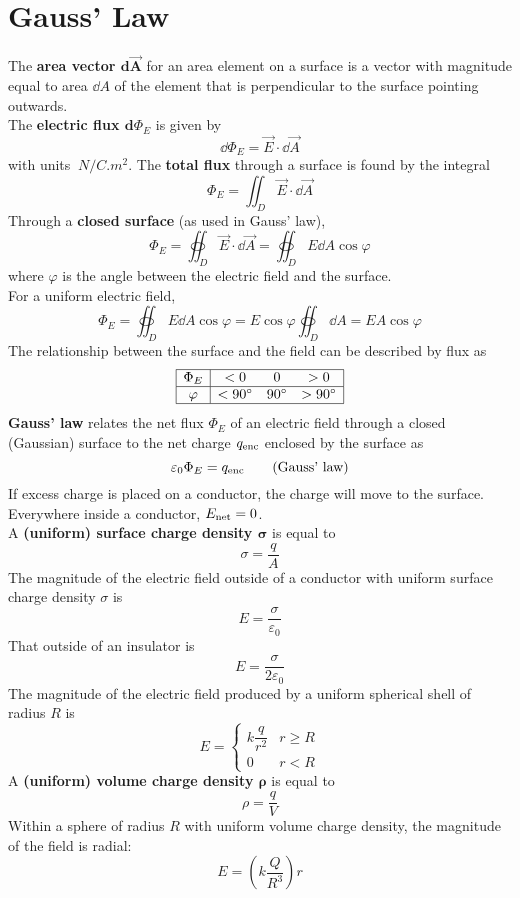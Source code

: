 \documentclass[./Electricity and Magnetism.tex]{subfiles}
\begin{document}
	\section{Gauss' Law}
		The \textbf{area vector \(\bm{\text{d}{\vec{A}}}\)} for an area element on a surface is a vector with magnitude equal to area \(\dd{A}\) of the element that is perpendicular to the surface pointing outwards. \\
		The \textbf{electric flux \({\bm{\text{d}}{\Phi_E}}\)} is given by
			\[\dd{\Phi_E} = \vec{E} \cdot \dd{\vec{A}} \tag{electric flux}\]
			with units \(\SI{}{N/C.m^2}\).
			The \textbf{total flux} through a surface is found by the integral
				\[\Phi_E = \iint_D \vec{E} \cdot \dd{\vec{A}} \tag{total flux}\]
			Through a \textbf{closed surface} (as used in Gauss' law),
				\[\Phi_E = \oiint_D \vec{E} \cdot \dd{\vec{A}} = \oiint_D E\dd{A}\cos\varphi \tag{net flux}\]
				where \(\varphi\) is the angle between the electric field and the surface. \\
				For a uniform electric field,
				\[\Phi_E = \oiint_D E \dd{A} \cos\varphi = E\cos\varphi\oiint_D \dd{A} = EA\cos\varphi \]
			The relationship between the surface and the field can be described by flux as
			\[
				\begin{array}{|c|ccc|}\hline
					\Phi_E & < 0 & 0 & > 0 \\\hline
					\varphi & < 90^\circ & 90^\circ & > 90^\circ \\\hline
				\end{array}
			\]
		\textbf{Gauss' law} relates the net flux \(\Phi_E\) of an electric field through a closed (Gaussian) surface to the net charge \(q_{\text{enc}}\) enclosed by the surface as
			\[\varepsilon_0\Phi_E = q_{\text{enc}} \tag{Gauss' law}\]
		If excess charge is placed on a conductor, the charge will move to the surface. \\
		Everywhere inside a conductor, \(E_{\text{net}} = 0\). \\	
		A \textbf{(uniform) surface charge density \(\bm{\sigma}\)} is equal to
			\[\sigma = \frac{q}{A} \tag{uniform surface charge density}\]
		The magnitude of the electric field outside of a conductor with uniform surface charge density \(\sigma\) is
			\[E = \frac{\sigma}{\varepsilon_0} \tag{conducting surface}\]
			That outside of an insulator is
			\[E = \frac{\sigma}{2\varepsilon_0} \tag{insulator}\]
		The magnitude of the electric field produced by a uniform spherical shell of radius \(R\) is
			\[
				E = \begin{cases}
 					k\dfrac{q}{r^2} & r \ge R \\
 					0 & r < R
 				\end{cases}
			\]
		A \textbf{(uniform) volume charge density \(\bm{\rho}\)} is equal to
			\[\rho = \frac{q}{V} \tag{uniform volume charge density}\]
		Within a sphere of radius \(R\) with uniform volume charge density, the magnitude of the field is radial:
			\[E = \left(k\frac{Q}{R^3}\right)r \tag{uniform charge, field at \(r \le R\)}\]
\end{document}
